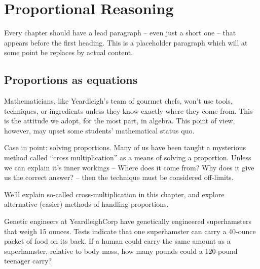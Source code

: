 \chapter{Proportional Reasoning}
\label{ch:proportions}



Every chapter should have a lead paragraph -- even just a short one -- that appears before the first heading. This is a placeholder paragraph which will at some point be replaces by actual content.

\section{Proportions as equations}
\label{sec:propsaseqs}

Mathematicians, like Yeardleigh's team of gourmet chefs, won't use tools, techniques, or ingredients unless they know exactly where they come from. This is the attitude we adopt, for the most part, in algebra. This point of view, however, may upset some students' mathematical status quo.

Case in point: solving proportions. Many of us have been taught a mysterious method called ``cross multiplication'' as a means of solving a proportion. Unless we can explain it's inner workings -- Where does it come from? Why does it give us the correct answer? -- then the technique must be considered off-limits.

We'll explain so-called cross-multiplication in this chapter, and explore alternative (easier) methods of handling proportions.

\begin{boxedexplore}
\end{boxedexplore}

\begin{boxedexplore}
Genetic engineers at YeardleighCorp have genetically engineered superhamsters that weigh 15 ounces. Tests indicate that one superhamster can carry a 40-ounce packet of food on its back. If a human could carry the same amount as a superhamster, relative to body mass, how many pounds could a 120-pound teenager carry?
\end{boxedexplore}

